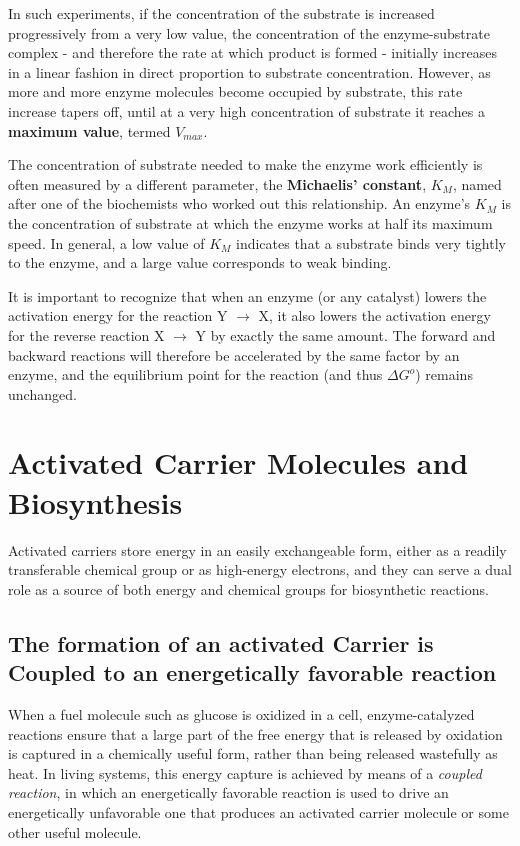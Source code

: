 In such experiments, if the concentration of the substrate is increased
progressively from a very low value, the concentration of the enzyme-substrate
complex - and therefore the rate at which product is formed - initially increases
in a linear fashion in direct proportion to substrate concentration.
However, as more and more enzyme molecules become occupied by substrate,
this rate increase tapers off, until at a very high concentration of substrate
it reaches a \textbf{maximum value}, termed $V_{max}$.

The concentration of substrate needed to make the enzyme work efficiently
is often measured by a different parameter, the \textbf{Michaelis’ constant},
\textbf{$K_M$}, named after one of the biochemists who worked out this relationship.
An enzyme’s $K_M$ is the concentration of substrate at which the enzyme
works at half its maximum speed. In general, a low
value of $K_M$ indicates that a substrate binds very tightly to the enzyme,
and a large value corresponds to weak binding.

It is important to recognize that when an enzyme (or any catalyst) lowers
the activation energy for the reaction Y $\rightarrow$ X, it also lowers the activation
energy for the reverse reaction X $\rightarrow$ Y by exactly the same amount.
The forward and backward reactions will therefore be accelerated by the same factor
by an enzyme, and the equilibrium point for the reaction (and thus $\Delta G^{o}$)
remains unchanged.

\section{Activated Carrier Molecules and Biosynthesis}

Activated carriers store energy in an easily exchangeable form, either
as a readily transferable chemical group or as high-energy electrons,
and they can serve a dual role as a source of both energy and chemical
groups for biosynthetic reactions.

\subsection{The formation of an activated Carrier is Coupled to an energetically favorable reaction}

When a fuel molecule such as glucose is oxidized in a cell, enzyme-catalyzed
reactions ensure that a large part of the free energy that is released
by oxidation is captured in a chemically useful form, rather than being
released wastefully as heat. In living systems, this energy capture is achieved by means of a
\textit{coupled reaction}, in which an energetically favorable reaction is used to
drive an energetically unfavorable one that produces an activated carrier
molecule or some other useful molecule.

